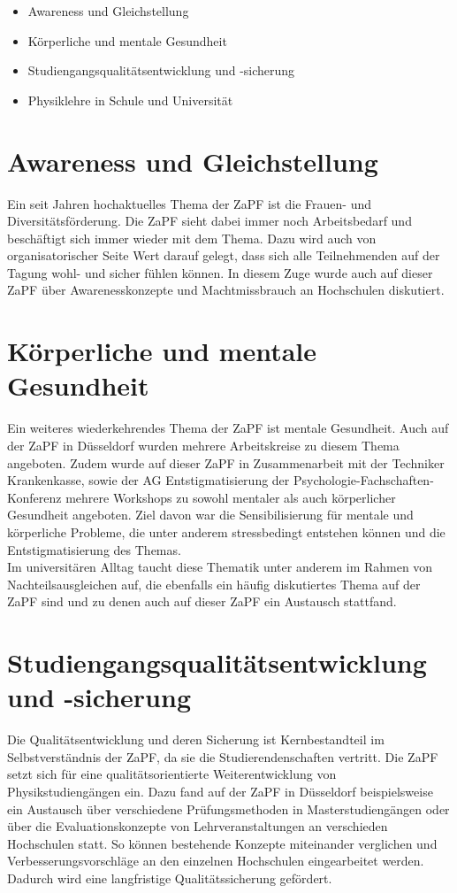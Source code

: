 \documentclass{scrartcl}
\begin{document}
\begin{itemize}
\item Awareness und Gleichstellung
\item Körperliche und mentale Gesundheit
\item Studiengangsqualitätsentwicklung und -sicherung
\item Physiklehre in Schule und Universität
\end{itemize}

\section*{Awareness und Gleichstellung}
Ein seit Jahren hochaktuelles Thema der ZaPF ist die Frauen- und Diversitätsförderung. Die ZaPF sieht dabei immer noch Arbeitsbedarf und beschäftigt sich immer wieder mit dem Thema. Dazu wird auch von organisatorischer Seite Wert darauf gelegt, dass sich alle Teilnehmenden auf der Tagung wohl- und sicher fühlen können. In diesem Zuge wurde auch auf dieser ZaPF über Awarenesskonzepte und Machtmissbrauch an Hochschulen diskutiert.

\section*{Körperliche und mentale Gesundheit}
Ein weiteres wiederkehrendes Thema der ZaPF ist mentale Gesundheit. Auch auf der ZaPF in Düsseldorf wurden mehrere Arbeitskreise zu diesem Thema angeboten. Zudem wurde auf dieser ZaPF in Zusammenarbeit mit der Techniker Krankenkasse, sowie der AG Entstigmatisierung der Psychologie-Fachschaften-Konferenz mehrere Workshops zu sowohl mentaler als auch körperlicher Gesundheit angeboten. Ziel davon war die Sensibilisierung für mentale und körperliche Probleme, die unter anderem stressbedingt entstehen können und die Entstigmatisierung des Themas.\\
Im universitären Alltag taucht diese Thematik unter anderem im Rahmen von Nachteilsausgleichen auf, die ebenfalls ein häufig diskutiertes Thema auf der ZaPF sind und zu denen auch auf dieser ZaPF ein Austausch stattfand.

\section*{Studiengangsqualitätsentwicklung und -sicherung}
Die Qualitätsentwicklung und deren Sicherung ist Kernbestandteil im Selbstverständnis der ZaPF, da sie die Studierendenschaften vertritt. Die ZaPF setzt sich für eine qualitätsorientierte Weiterentwicklung von Physikstudiengängen ein. Dazu fand auf der ZaPF in Düsseldorf beispielsweise ein Austausch über verschiedene Prüfungsmethoden in Masterstudiengängen oder über die Evaluationskonzepte von Lehrveranstaltungen an verschieden Hochschulen statt. So können bestehende Konzepte miteinander verglichen und Verbesserungsvorschläge an den einzelnen Hochschulen eingearbeitet werden. Dadurch wird eine langfristige Qualitätssicherung gefördert.
\end{document}
